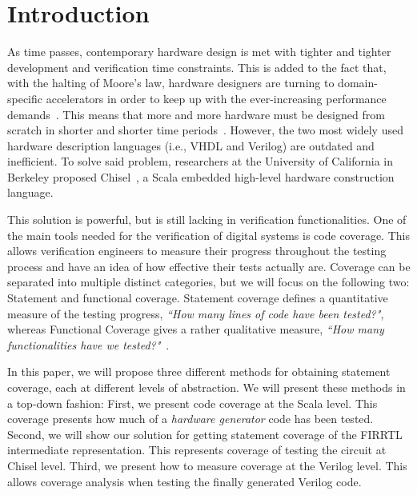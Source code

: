 \documentclass[runningheads]{llncs}
\newcommand{\martin}[1]{{\color{blue} Martin: #1}}
\begin{document}

\section{Introduction}
\label{sec:objectives}
As time passes, contemporary hardware design is met with tighter and tighter development and verification time constraints. This is added to the fact that, with the halting of Moore's law, hardware designers are turning to domain-specific accelerators in order to keep up with the ever-increasing performance demands~\cite{henn-patt:turing:2019}. This means that more and more hardware must be designed from scratch in shorter and shorter time periods~\cite{domain-hw-acc:2020}. However, the two most widely used hardware description languages (i.e., VHDL and Verilog) are outdated and inefficient. To solve said problem, researchers at the University of California in Berkeley proposed Chisel~\cite{chisel:dac2012}, a Scala embedded high-level hardware construction language.

This solution is powerful, but is still lacking in verification functionalities. One of the main tools needed for the verification of digital systems is code coverage. This allows verification engineers to measure their progress throughout the testing process and have an idea of how effective their tests actually are. Coverage can be separated into multiple distinct categories, but we will focus on the following two: Statement and functional coverage. Statement coverage defines a quantitative measure of the testing progress, \textit{``How many lines of code have been tested?"}, whereas Functional Coverage gives a rather qualitative measure, \textit{``How many functionalities have we tested?"}~\cite{spear2008systemverilog}.


In this paper, we will propose three different methods for obtaining statement coverage, each at different levels of abstraction. We will present these methods in a top-down fashion: First, we present code coverage at the Scala level. This coverage presents how much of a \emph{hardware generator} code has been tested. 
Second, we will show our solution for getting statement coverage of the FIRRTL intermediate representation. This represents coverage of testing the circuit at Chisel level. Third, we present how to measure coverage at the Verilog level. This allows coverage analysis when testing the finally generated Verilog code.
\end{document}
